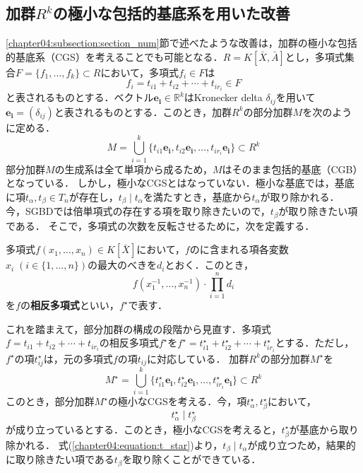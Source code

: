 \subsection{加群$R^k$の極小な包括的\groebner{}基底系を用いた改善}
\ref{chapter04:subsection:section_num}節で述べたような改善は，加群の極小な包括的\groebner{}基底系（CGS）を考えることでも可能となる．$R = K[\bar{X}, \bar{A}]$とし，多項式集合$F = \{f_1, \dots, f_k\} \subset R$において，多項式$f_i \in F$は
$$f_i = t_{i1} + t_{i2} + \cdots + t_{ir_i} \in F$$
と表されるものとする．ベクトル$\bm{e_i} \in \mathbb{R}^k$はKronecker delta $\delta_{ij}$を用いて$\bm{e_i} = (\delta_{ij})$と表されるものとする．このとき，加群$R^k$の部分加群$M$を次のように定める．
$$M = \bigcup_{i=1}^k \{t_{i1}\bm{e_i}, t_{i2}\bm{e_i}, \dots, t_{ir_i}\bm{e_i}\} \subset R^k$$
部分加群$M$の生成系は全て単項から成るため，$M$はそのまま包括的\groebner{}基底（CGB）となっている．
しかし，極小なCGSとはなっていない．極小な\groebner{}基底では，基底に項$t_\alpha, t_\beta \in T_n$が存在し，$t_\beta \mid t_\alpha$を満たすとき，基底から$t_\alpha$が取り除かれる．
今，SGBDでは倍単項式の存在する項を取り除きたいので，$t_\beta$が取り除きたい項である．
そこで，多項式の次数を反転させるために，次を定義する．
\begin{definition}[相反多項式]
	多項式$f(x_1, \dots, x_n) \in K[\bar{X}]$において，$f$のに含まれる項各変数$x_i \; (i \in \{1, \dots, n\})$の最大のべきを$d_i$とおく．このとき，
	$$f(x_1^{-1}, \dots, x_n^{-1})\cdot \prod_{i=1}^n d_i$$
	を$f$の\textbf{相反多項式}といい，$f^{\star}$で表す．
\end{definition}
これを踏まえて，部分加群の構成の段階から見直す．多項式$f = t_{i1} + t_{i2} + \cdots + t_{ir_i}$の相反多項式$f^{\star}$を$f^{\star} = t_{i1}^{\star} + t_{i2}^{\star} + \cdots + t_{ir_i}^{\star}$とする．ただし，$f^\star$の項$t_{ij}^\star$は，元の多項式$f$の項$t_{ij}$に対応している．
加群$R^k$の部分加群$M^\star$を
$$M^\star = \bigcup_{i=1}^k \{t_{i1}^{\star}\bm{e_i}, t_{i2}^{\star}\bm{e_i}, \dots, t_{ir_i}^{\star}\bm{e_i}\} \subset R^k$$
このとき，部分加群$M^{\star}$の極小なCGSを考える．今，項$t_\alpha^\star, t_\beta^\star$において，
\begin{equation}
	t_\alpha^\star \mid t_\beta^\star \label{chapter04:equation:t_star}
\end{equation}
が成り立っているとする．このとき，極小なCGSを考えると，$t_\beta^{\star}$が基底から取り除かれる．
式(\ref{chapter04:equation:t_star})より，$t_\beta \mid t_\alpha$が成り立つため，結果的に取り除きたい項である$t_\beta$を取り除くことができている．







